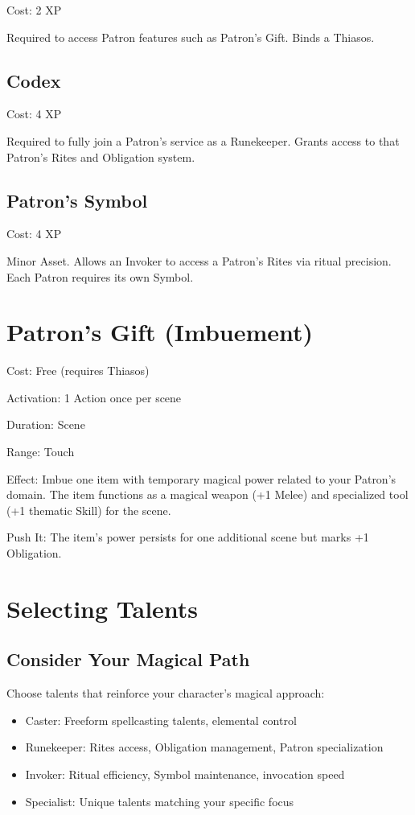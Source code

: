 \documentclass[11pt,twoside,openany]{book}
\begin{document}
Cost: 2 XP

Required to access Patron features such as Patron's Gift. Binds a Thiasos.

\subsection*{Codex}

Cost: 4 XP

Required to fully join a Patron's service as a Runekeeper. Grants access to that Patron's Rites and Obligation system.

\subsection*{Patron's Symbol}

Cost: 4 XP

Minor Asset. Allows an Invoker to access a Patron's Rites via ritual precision. Each Patron requires its own Symbol.

\section*{Patron's Gift (Imbuement)} 

Cost: Free (requires Thiasos)

Activation: 1 Action once per scene

Duration: Scene

Range: Touch

Effect: Imbue one item with temporary magical power related to your Patron's domain. The item functions as a magical weapon (+1 Melee) and specialized tool (+1 thematic Skill) for the scene.

Push It: The item's power persists for one additional scene but marks +1 Obligation.

\section*{Selecting Talents} 

\subsection*{Consider Your Magical Path}

Choose talents that reinforce your character's magical approach:
\begin{itemize}
\item Caster: Freeform spellcasting talents, elemental control
\item Runekeeper: Rites access, Obligation management, Patron specialization
\item Invoker: Ritual efficiency, Symbol maintenance, invocation speed
\item Specialist: Unique talents matching your specific focus
\end{itemize}
\end{document}
